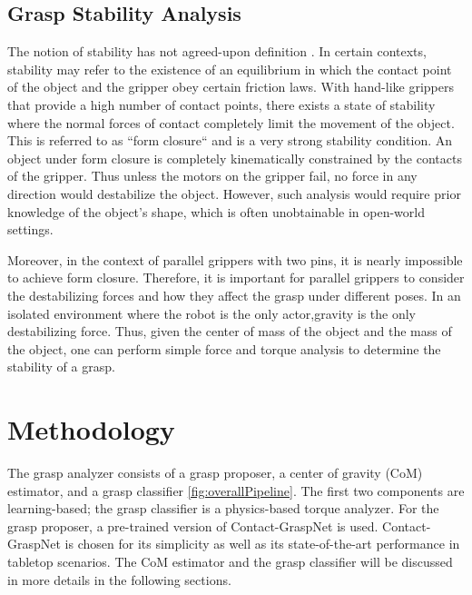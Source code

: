\documentclass[12pt]{ucsddissertation}
\begin{document}
\section{Grasp Stability Analysis}
The notion of stability has not agreed-upon definition \cite{DBLP:journals/corr/abs-2103-06252}. In certain contexts, stability may refer to the existence of an equilibrium in which the contact point of the object and the gripper obey certain friction laws. With hand-like grippers that provide a high number of contact points, there exists a state of stability where the normal forces of contact completely limit the movement of the object. This is referred to as ``form closure`` \cite{Dizioğlu_Lakshiminarayana_1984} and is a very strong stability condition. An object under form closure is completely kinematically constrained by the contacts of the gripper. Thus unless the motors on the gripper fail, no force in any direction would destabilize the object. However, such analysis would require prior knowledge of the object's shape, which is often unobtainable in open-world settings.

Moreover, in the context of parallel grippers with two pins, it is nearly impossible to achieve form closure. Therefore, it is important for parallel grippers to consider the destabilizing forces and how they affect the grasp under different poses. In an isolated environment where the robot is the only actor,gravity is the only destabilizing force. Thus, given the center of mass of the object and the mass of the object, one can perform simple force and torque analysis to determine the stability of a grasp.


\chapter{Methodology}
The grasp analyzer consists of a grasp proposer, a center of gravity (CoM) estimator, and a grasp classifier \ref{fig:overallPipeline}. The first two components are learning-based; the grasp classifier is a physics-based torque analyzer. For the grasp proposer, a pre-trained version of Contact-GraspNet \cite{Sundermeyer_Mousavian_Triebel_Fox_2021} is used. Contact-GraspNet is chosen for its simplicity as well as its state-of-the-art performance in tabletop scenarios. The CoM estimator and the grasp classifier will be discussed in more details in the following sections.
\end{document}
